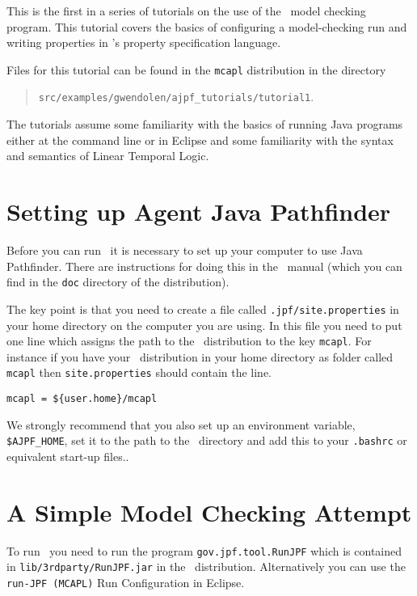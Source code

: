 
This is the first in a series of tutorials on the use of the \ajpf\ model checking program.  This tutorial covers the basics of configuring a model-checking run and writing properties in \ajpf's property specification language.

Files for this tutorial can be found in the \texttt{mcapl} distribution in the directory 
\begin{quote}
\texttt{src/examples/gwendolen/ajpf\_tutorials/tutorial1}.
\end{quote}

The tutorials assume some familiarity with the basics of running Java programs either at the command line or in Eclipse and some familiarity with the syntax and semantics of Linear Temporal Logic.

\section{Setting up Agent Java Pathfinder}
Before you can run \ajpf\ it is necessary to set up your computer to use Java Pathfinder.  There are instructions for doing this in the \mcapl\ manual (which you can find in the \texttt{doc} directory of the distribution).

The key point is that you need to create a file called \texttt{.jpf/site.properties} in your home directory on the computer you are using.  In this file you need to put one line which assigns the path to the \mcapl\ distribution to the key \texttt{mcapl}.  For instance if you have your \mcapl\ distribution in your home directory as  folder called \texttt{mcapl} then \texttt{site.properties} should contain the line.

\begin{verbatim}
mcapl = ${user.home}/mcapl
\end{verbatim}

We strongly recommend that you also set up an environment variable, \texttt{\$AJPF\_HOME}, set it to the path to the \mcapl\ directory and add this to your \texttt{.bashrc} or equivalent start-up files..

\section{A Simple Model Checking Attempt}

To run \ajpf\ you need to run the program \texttt{gov.jpf.tool.RunJPF} which is contained in \texttt{lib/3rdparty/RunJPF.jar} in the \mcapl\ distribution.  Alternatively you can use the \texttt{run-JPF (MCAPL)} Run Configuration in Eclipse.

